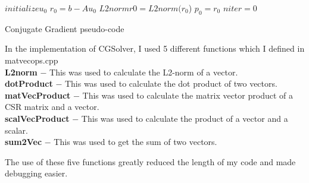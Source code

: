 \documentclass{article}
\begin{document}
\setlength{\parindent}{0pt}
\setlength{\parskip}{1ex}

\begin{algorithm}
 \SetAlgoLined
 $initialize u_0$\;
 $r_0 = b - A u_0$\;
 $L2normr0 = L2norm(r_0$)\;
 $p_0 = r_0$\;
 $niter = 0$\;
 \caption{Conjugate Gradient pseudo-code}
\end{algorithm}

In the implementation of CGSolver, I used 5 different functions which I defined
in matvecops.cpp\\
\textbf{L2norm} $-$ This was used to calculate the L2-norm of a vector.\\
\textbf{dotProduct} $-$ This was used to calculate the dot product of two vectors.\\
\textbf{matVecProduct} $-$ This was used to calculate the matrix vector product of a
CSR matrix and a vector.\\
\textbf{scalVecProduct} $-$ This was used to calculate the product of a vector and a
scalar.\\
\textbf{sum2Vec} $-$ This was used to get the sum of two vectors.

The use of these five functions greatly reduced the length of my code and made
debugging easier.
\end{document}
